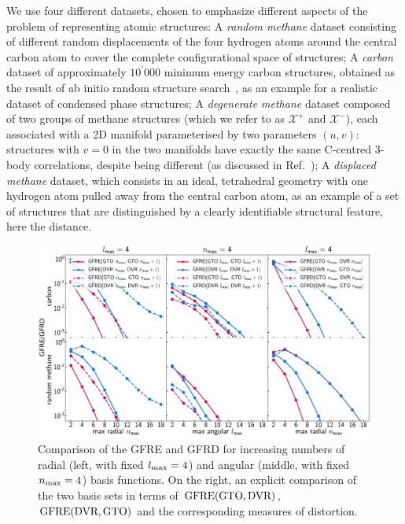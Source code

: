 We use four different datasets, chosen to emphasize different aspects of the problem of representing atomic structures: A \textit{random methane} dataset consisting of different random displacements of the four hydrogen atoms around the central carbon atom to cover the complete configurational space of  structures; A \textit{carbon} dataset of approximately $10^{\prime}000$ minimum energy carbon structures, obtained as the result of ab initio random structure search~\cite{pick-need11jpcm, pickard-carbon}, as an example for a realistic dataset of condensed phase structures; A \textit{degenerate methane} dataset composed of two groups of methane structures (which we refer to as $\mathcal{X}^+$ and $\mathcal{X}^-$), each associated with a 2D manifold parameterised by two parameters $(u,v)$: structures with $v=0$ in the two manifolds have exactly the same C-centred 3-body correlations, despite being different (as discussed in Ref.~);  A \textit{displaced methane} dataset, which consists in an ideal, tetrahedral  geometry with one hydrogen atom pulled away from the central carbon atom, as an example of a set of structures that are distinguished by a clearly identifiable structural feature, here the  distance.


\begin{figure}
    \includegraphics[width=0.9\linewidth]{fig/rof/soap_convergence-carbon_methane-inkscaped.pdf}
    \caption{Comparison of the GFRE and GFRD for increasing numbers of radial (left, with fixed $l_\mathrm{max}=4$) and angular (middle, with fixed $n_\mathrm{max}=4$) basis functions.  On the right, an explicit comparison of the two basis sets in terms of $\operatorname{GFRE}(\text{GTO},\text{DVR})$, $\operatorname{GFRE}(\text{DVR},\text{GTO})$ and the corresponding measures of distortion.}
    \label{fig:soap-convergence}
\end{figure}


